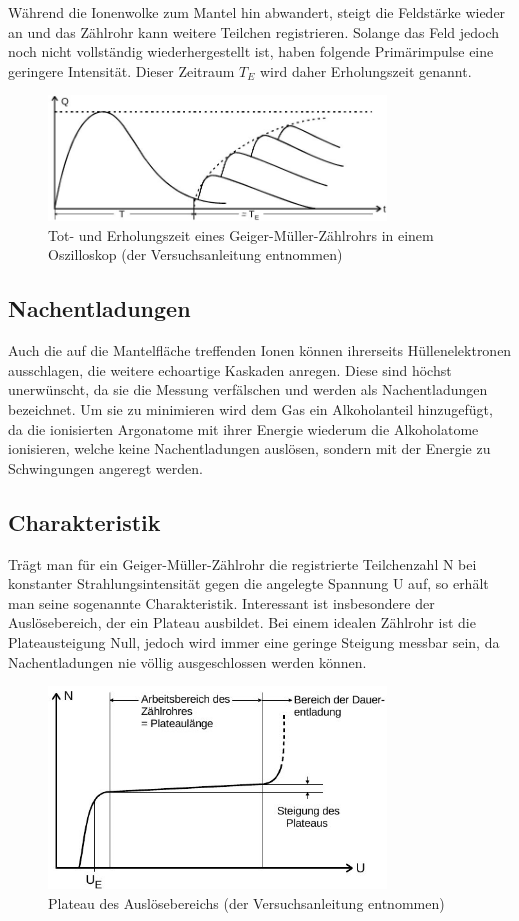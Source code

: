 Während die Ionenwolke zum Mantel hin abwandert, steigt die Feldstärke wieder an und das Zählrohr kann weitere Teilchen registrieren. Solange das Feld jedoch noch nicht vollständig wiederhergestellt ist, haben folgende Primärimpulse eine geringere Intensität. Dieser Zeitraum $T_E$ wird daher Erholungszeit genannt.
\begin{figure}[htbp]
\includegraphics[width=0.8\textwidth]{pics/erholungszeit.jpg}
\caption{Tot- und Erholungszeit eines Geiger-Müller-Zählrohrs in einem Oszilloskop (der Versuchsanleitung entnommen)}
\label{pic_totzeit}
\end{figure}

\subsection{Nachentladungen}
Auch die auf die Mantelfläche treffenden Ionen können ihrerseits Hüllenelektronen ausschlagen, die weitere echoartige Kaskaden anregen. Diese sind höchst unerwünscht, da sie die Messung verfälschen und werden als Nachentladungen bezeichnet. Um sie zu minimieren wird dem Gas ein Alkoholanteil hinzugefügt, da die ionisierten Argonatome mit ihrer Energie wiederum die Alkoholatome ionisieren, welche keine Nachentladungen auslösen, sondern mit der Energie zu Schwingungen angeregt werden.

\subsection{Charakteristik}
Trägt man für ein Geiger-Müller-Zählrohr die registrierte Teilchenzahl N bei konstanter Strahlungsintensität gegen die angelegte Spannung U auf, so erhält man seine sogenannte Charakteristik.
Interessant ist insbesondere der Auslösebereich, der ein Plateau ausbildet. Bei einem idealen Zählrohr ist die Plateausteigung Null, jedoch wird immer eine geringe Steigung messbar sein, da Nachentladungen nie völlig ausgeschlossen werden können.
\begin{figure}[htbp]
\includegraphics[width=0.8\textwidth]{pics/plateau.jpg}
\caption{Plateau des Auslösebereichs (der Versuchsanleitung entnommen)}
\end{figure}


